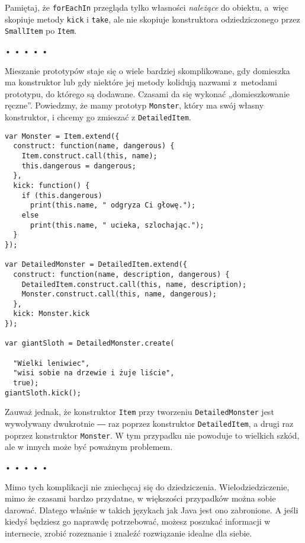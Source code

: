 Pamiętaj, że \texttt{forEachIn} przegląda tylko własności \emph{należące} do obiektu, a~więc skopiuje metody \texttt{kick} i \texttt{take}, ale nie skopiuje konstruktora odziedziczonego przez \texttt{SmallItem} po \texttt{Item}.



\begin{center}
• • • • •
\end{center}

  
Mieszanie prototypów staje się o wiele bardziej skomplikowane, gdy domieszka ma konstruktor lub gdy niektóre jej metody kolidują nazwami z~metodami prototypu, do którego są dodawane. Czasami da się wykonać „domieszkowanie ręczne”. Powiedzmy, że mamy prototyp \texttt{Monster}, który ma swój własny konstruktor, i chcemy go zmieszać z \texttt{DetailedItem}.

  
\begin{verbatim} 
var Monster = Item.extend({
  construct: function(name, dangerous) {
    Item.construct.call(this, name);
    this.dangerous = dangerous;
  },
  kick: function() {
    if (this.dangerous)
      print(this.name, " odgryza Ci głowę.");
    else
      print(this.name, " ucieka, szlochając.");
  }
});

var DetailedMonster = DetailedItem.extend({
  construct: function(name, description, dangerous) {
    DetailedItem.construct.call(this, name, description);
    Monster.construct.call(this, name, dangerous);
  },
  kick: Monster.kick
});

var giantSloth = DetailedMonster.create(

  "Wielki leniwiec",
  "wisi sobie na drzewie i żuje liście",
  true);
giantSloth.kick();
 \end{verbatim}
  
Zauważ jednak, że konstruktor \texttt{Item} przy tworzeniu \texttt{DetailedMonster} jest wywoływany dwukrotnie ― raz poprzez konstruktor \texttt{DetailedItem}, a drugi raz poprzez konstruktor \texttt{Monster}. W tym przypadku nie powoduje to wielkich szkód, ale w innych może być poważnym problemem.



\begin{center}
• • • • •
\end{center}

  
Mimo tych komplikacji nie zniechęcaj się do dziedziczenia. Wielodziedziczenie, mimo że czasami bardzo przydatne, w większości przypadków można sobie darować. Dlatego właśnie w takich językach jak Java jest ono zabronione. A jeśli kiedyś będziesz go naprawdę potrzebować, możesz poszukać informacji w internecie, zrobić rozeznanie i znaleźć rozwiązanie idealne dla siebie.

